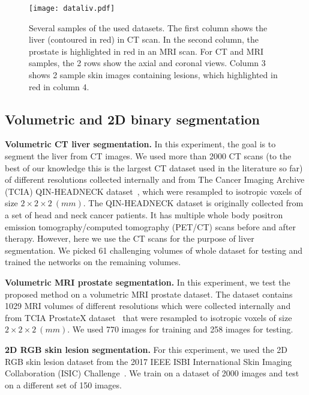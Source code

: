\documentclass{article}
\begin{document}
\begin{figure}
\centering
\texttt{[image: dataliv.pdf]}
\caption{Several samples of the used datasets. The first column shows the liver (contoured in red) in CT scan. In the second column, the prostate is highlighted in red in an MRI scan. For CT and MRI samples, the 2 rows show the axial and coronal views. Column 3  shows 2 sample skin images containing lesions, which highlighted in red in column 4.}
\label{figure3}
\end{figure}


\subsection{Volumetric and 2D binary segmentation}

\textbf{Volumetric CT liver segmentation.} In this experiment, the goal is to segment the liver from CT images. We used more than 2000 CT scans (to the best of our knowledge this is the largest CT dataset used in the literature so far) of different resolutions collected internally and from The Cancer Imaging Archive (TCIA) QIN-HEADNECK dataset~\cite{QINheadNeck2015, QINheadNeck2016, clark2013cancer}, which were resampled to isotropic voxels of size $2\times2\times2 \ (mm)$. The QIN-HEADNECK dataset is originally collected from a set of head and neck cancer patients. It has multiple whole body positron emission tomography/computed tomography (PET/CT) scans before and after therapy. However, here we use the CT scans for the purpose of liver segmentation. We picked 61 challenging volumes of whole dataset for testing and trained the networks on the remaining volumes.

\noindent \textbf{Volumetric MRI prostate segmentation.} In this experiment, we test the proposed method on a volumetric MRI prostate dataset. The dataset contains 1029 MRI volumes of different resolutions which were collected internally and from TCIA ProstateX dataset~\cite{ProstateX2017,litjens2014computer,clark2013cancer} that were resampled to isotropic voxels of size $2\times2\times2 \ (mm)$. We used 770 images for training and 258 images for testing.

\noindent \textbf{2D RGB skin lesion segmentation.} For this experiment, we used the 2D RGB skin lesion dataset from the 2017 IEEE ISBI International Skin Imaging Collaboration (ISIC) Challenge~\cite{codella2017skin}. We train on a dataset of 2000 images and test on a different set of 150 images.
\end{document}
